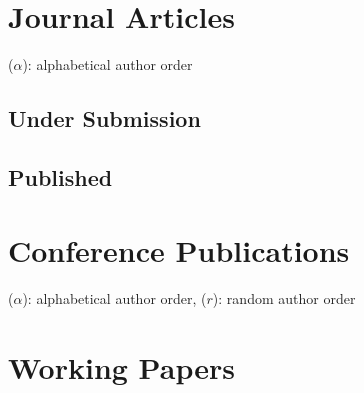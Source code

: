\documentclass{article}
\begin{document}
	\section{Journal Articles}
	
	\renewcommand{\labelenumi}{J\theenumi.}
	{\footnotesize($\alpha$): alphabetical author order}
	
	\subsection{Under Submission}
    \vspace{-.3em}
    \begin{etaremune}
    [itemsep=0.2ex,
    	leftmargin=4.8ex]
        
    \end{etaremune}
    
	
	\subsection{Published}
	\vspace{-.3em}
	
    \begin{etaremune}
    [itemsep=0.2ex,
    	leftmargin=4.8ex, resume]
        
    \end{etaremune}
    
    
    
	

    \section{Conference Publications}
    {\footnotesize($\alpha$): alphabetical author order, ($r$): random author order}
    
    \begin{etaremune}
    	[itemsep=0.2ex,
    	leftmargin=4.8ex]
    	\renewcommand{\labelenumi}{C\theenumi.}
        
    \end{etaremune}
    
    \section{Working Papers}
    \begin{etaremune}
    	[itemsep=0.2ex,
    	leftmargin=4.8ex]
    	\renewcommand{\labelenumi}{W\theenumi.}
        
    \end{etaremune}
    
\end{document}
